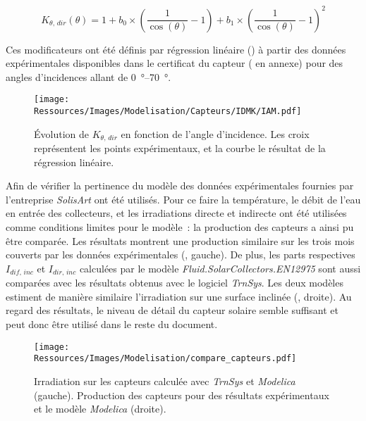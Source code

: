 \begin{equation}\label{eq:iam_dir_plan_model}
    K_{\theta,\,dir} (\theta) = 1 + b_{0} \times \left(\frac{1}{\cos(\theta)} - 1\right)
                                  + b_{1} \times \left(\frac{1}{\cos(\theta)} - 1\right)^{2}
\end{equation}

Ces modificateurs ont été définis par régression linéaire () à partir des données
expérimentales disponibles dans le certificat du capteur ( en annexe)
pour des angles d’incidences allant de \SIrange{0}{70}{\degree}.

\begin{figure}
    \centering
    \texttt{[image: Ressources/Images/Modelisation/Capteurs/IDMK/IAM.pdf]}
    \caption[ pour le rayonnement direct]
             {Évolution de $K_{\theta,\,dir}$ en fonction de l’angle d’incidence.
              Les croix représentent les points expérimentaux, et la courbe le résultat
              de la régression linéaire.}
    \label{fig:IAM_idmk}
\end{figure}

Afin de vérifier la pertinence du modèle des données expérimentales fournies par
l’entreprise \textit{SolisArt} ont été utilisés. Pour ce faire la température, le débit
de l’eau en entrée des collecteurs, et les irradiations directe et indirecte ont été
utilisées comme conditions limites pour le modèle~: la production des capteurs a ainsi pu
être comparée. Les résultats montrent une production similaire sur les trois mois couverts
par les données expérimentales (, gauche). De plus, les
parts respectives $I_{dif,\,inc}$ et $I_{dir,\,inc}$ calculées par le modèle
\textit{Fluid.SolarCollectors.EN12975} sont aussi comparées avec les résultats obtenus avec
le logiciel \textit{TrnSys}. Les deux modèles estiment de manière similaire l’irradiation
sur une surface inclinée (, droite). Au regard des résultats,
le niveau de détail du capteur solaire semble suffisant et peut donc être utilisé dans le
reste du document.

\begin{figure}
    \centering
    \texttt{[image: Ressources/Images/Modelisation/compare\_capteurs.pdf]}
    \caption[Comparaisons de l’irradiation entre \textit{TrnSys}, \textit{Modelica} et des résultats expérimentaux]
             {Irradiation sur les capteurs calculée avec \textit{TrnSys} et \textit{Modelica} (gauche).
             Production des capteurs pour des résultats expérimentaux et le modèle \textit{Modelica} (droite).}
    \label{fig:compare_capteurs}
\end{figure}
\FloatBarrier


